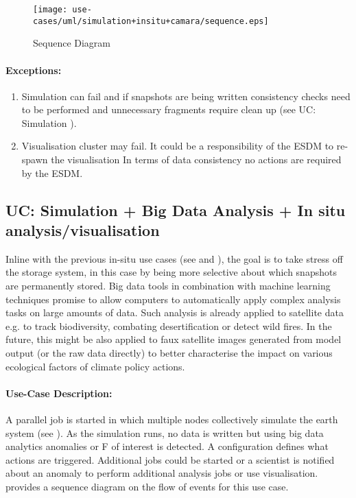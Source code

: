 \begin{figure}
	\centering
	\texttt{[image: use-cases/uml/simulation+insitu+camara/sequence.eps]}
	\caption{Sequence Diagram}
	\label{fig:sequence simulation + in-situ + cam}
\end{figure}



\paragraph{Exceptions:}
\begin{enumerate}
	\item Simulation can fail and if snapshots are being written consistency checks need to be performed and unnecessary fragments require clean up (see UC: Simulation ).
	\item Visualisation cluster may fail. It could be a responsibility of the ESDM to re-spawn the visualisation In terms of data consistency no actions are required by the ESDM.
\end{enumerate}





\subsection{UC: Simulation + Big Data Analysis + In situ analysis/visualisation}
\label{uc: simulation + big data + in-situ}

Inline with the previous in-situ use cases (see  and ), the goal is to take stress off the storage system, in this case by being more selective about which snapshots are permanently stored.
Big data tools in combination with machine learning techniques promise to allow computers to automatically apply complex analysis tasks on large amounts of data.
Such analysis is already applied to satellite data e.g. to track biodiversity, combating desertification or detect wild fires.
In the future, this might be also applied to faux satellite images  generated from model output (or the raw data directly) to better characterise the impact on various ecological factors of climate policy actions.



\paragraph{Use-Case Description:}
A parallel job is started in which multiple nodes collectively simulate the earth system (see ).
As the simulation runs, no data is written but using big data analytics anomalies or F of interest is detected.
A configuration defines what actions are triggered.
Additional jobs could be started or a scientist is notified about an anomaly to perform additional analysis jobs or use visualisation.
 provides a sequence diagram on the flow of events for this use case.

